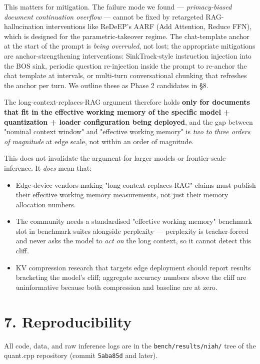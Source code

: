 \documentclass[11pt]{article}
\begin{document}
This matters for mitigation. The failure mode we found — \textit{primacy-biased document continuation overflow} — cannot be fixed by retargeted RAG-hallucination interventions like ReDeEP's AARF (Add Attention, Reduce FFN), which is designed for the parametric-takeover regime. The chat-template anchor at the start of the prompt is \textit{being overruled}, not lost; the appropriate mitigations are anchor-strengthening interventions: SinkTrack-style instruction injection into the BOS sink, periodic question re-injection inside the prompt to re-anchor the chat template at intervals, or multi-turn conversational chunking that refreshes the anchor per turn. We outline these as Phase 2 candidates in §8.


The long-context-replaces-RAG argument therefore holds \textbf{only for documents that fit in the effective working memory of the specific model + quantization + loader configuration being deployed}, and the gap between "nominal context window" and "effective working memory" is \textit{two to three orders of magnitude} at edge scale, not within an order of magnitude.


This does not invalidate the argument for larger models or frontier-scale inference. It \textit{does} mean that:

\begin{itemize}
\item Edge-device vendors making "long-context replaces RAG" claims must publish their effective working memory measurements, not just their memory allocation numbers.
\item The community needs a standardised "effective working memory" benchmark slot in benchmark suites alongside perplexity — perplexity is teacher-forced and never asks the model to \textit{act on} the long context, so it cannot detect this cliff.
\item KV compression research that targets edge deployment should report results bracketing the model's cliff; aggregate accuracy numbers above the cliff are uninformative because both compression and baseline are at zero.
\end{itemize}


\section*{7. Reproducibility}


All code, data, and raw inference logs are in the \texttt{bench/results/niah/} tree of the quant.cpp repository (commit \texttt{5aba85d} and later).
\end{document}
